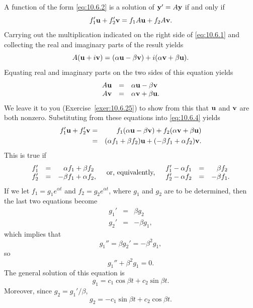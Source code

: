 \proof A function of the form \eqref{eq:10.6.2} is a solution of ${\bf y}'=A{\bf y}$ if and only if
\begin{equation}
  \label{eq:10.6.4}f_{1}'{\bf u}+f_{2}'{\bf v}=f_{1}A{\bf u}+f_{2}A{\bf v}.
\end{equation}
Carrying out the multiplication indicated on the right side of \eqref{eq:10.6.1} and collecting the
real and imaginary parts of the result yields
\[
  A({\bf u}+i{\bf v})=(\alpha{\bf u}-\beta{\bf v})+i(\alpha{\bf v}+\beta{\bf u}).
\]
Equating real and imaginary parts on the two sides of this equation yields
\[
  \begin{array}{rcl}
    A{\bf u} & = & \alpha{\bf u}-\beta{\bf v}  \\
    A{\bf v} & = & \alpha{\bf v}+\beta{\bf u}.
  \end{array}
\]
We leave it to you (Exercise~\ref{exer:10.6.25}) to show from this that ${\bf u}$ and ${\bf v}$ are
both nonzero. Substituting from these equations into \eqref{eq:10.6.4} yields
\begin{eqnarray*}
  f_{1}'{\bf u}+f_{2}'{\bf v} & = & f_{1}(\alpha{\bf u}-\beta{\bf v})+f_{2}(\alpha{\bf v}+\beta{\bf u}) \\
                              & = & (\alpha f_{1}+\beta f_{2}){\bf u}+(-\beta f_{1}+\alpha f_{2}){\bf v}.
\end{eqnarray*}
This is true if
\[
  \begin{array}{rcr}
    f_{1}' & = & \alpha f_{1}+\beta f_{2}\phantom{,} \\
    f_{2}' & = & -\beta f_{1}+\alpha f_{2},
  \end{array}
  \mbox{\quad or, equivalently,\quad}
  \begin{array}{rcr}
    f_{1}'-\alpha f_{1} & = & \phantom{-}\beta f_{2}\phantom{.} \\
    f_{2}'-\alpha f_{2} & = & -\beta f_{1}.
  \end{array}
\]
If we let $f_{1}=g_{1}e^{\alpha t}$ and $f_{2}=g_{2}e^{\alpha t}$, where $g_{1}$ and $g_{2}$ are to
be determined, then the last two equations become
\[
  \begin{array}{rcr}
    g_{1}' & = & \beta g_{2}\phantom{.} \\
    g_{2}' & = & -\beta g_{1},
  \end{array}
\]
which implies that
\[
  g_{1}''=\beta g_{2}'=-\beta^{2}g_{1},
\]
so
\[
  g_{1}''+\beta^{2}g_{1}=0.
\]
The general solution of this equation is
\[
  g_{1}=c_{1}\cos\beta t+c_{2}\sin\beta t.
\]
Moreover, since $g_{2}=g_{1}'/\beta$,
\[
  g_{2}=-c_{1}\sin\beta t+c_{2}\cos\beta t.
\]

